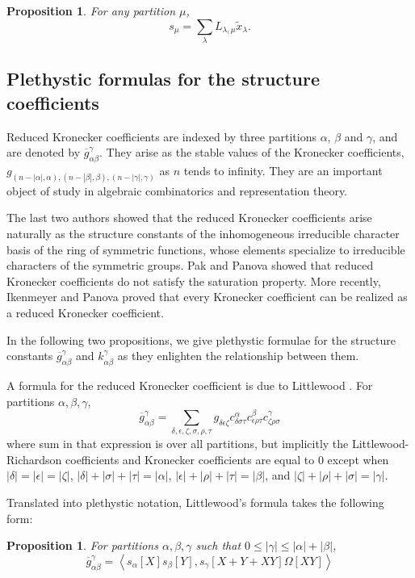 \documentclass{amsart}
\newtheorem{prop}[lemma]{Proposition}
\theoremstyle{definition}
\newcommand{\xt}{\tilde x}
\begin{document}
\begin{prop}
	For any partition $\mu$,
	\[s_\mu=\sum_\lambda L_{\lambda,\mu}\xt_\lambda.\]
\end{prop}


\subsection{Plethystic formulas for the structure coefficients} 
Reduced Kronecker coefficients are indexed by three partitions $\alpha$, $\beta$ and $\gamma$,
and are denoted by $\overline{g}_{\alpha\beta}^\gamma$. They arise as the stable values of
the Kronecker coefficients, $g_{(n-|\alpha|,\alpha), (n-|\beta|,\beta),(n-|\gamma|,\gamma)}$
as $n$ tends to infinity. They are an important object of study in algebraic combinatorics
and representation theory.

The last two authors \cite{OZ_character} showed that the reduced Kronecker coefficients
arise naturally as the structure constants of the inhomogeneous irreducible character
basis of the ring of symmetric functions, whose elements specialize to irreducible
characters of the symmetric groups. Pak and Panova \cite{PP2020} showed that reduced
Kronecker coefficients do not satisfy the saturation property. More recently,
Ikenmeyer and Panova \cite{IP2024} proved that every Kronecker coefficient can be
realized as a reduced Kronecker coefficient.

In the following two propositions, we give plethystic formulae for the
structure constants $\overline{g}_{\alpha\beta}^\gamma$ and $k_{\alpha\beta}^\gamma$ as they enlighten the relationship between them.



A formula for the reduced Kronecker coefficient is due to Littlewood
\cite[Theorem IX]{Littlewood}.  For partitions $\alpha, \beta, \gamma$,
\[
\overline{g}_{\alpha\beta}^\gamma = \sum_{\delta,\epsilon,\zeta, \sigma, \rho, \tau}
g_{\delta\epsilon\zeta} c^\alpha_{\delta\sigma\tau} c^\beta_{\epsilon\rho\tau} c^\gamma_{\zeta\rho\sigma}
\]
where sum in that expression is over all partitions, but implicitly
the Littlewood-Richardson coefficients
and Kronecker coefficients are equal to $0$ except when
$|\delta|=|\epsilon|=|\zeta|$, $|\delta|+|\sigma|+|\tau| = |\alpha|$,
$|\epsilon|+|\rho|+|\tau|=|\beta|$, and $|\zeta|+|\rho|+|\sigma|=|\gamma|$.

Translated into plethystic notation, Littlewood's formula takes the following form:

\begin{prop}
\label{prop:pleth_irred_structure}
For partitions $\alpha, \beta, \gamma$ such that $0 \leq |\gamma| \leqslant |\alpha|+|\beta|$,
\[
\overline{g}_{\alpha\beta}^\gamma = \left< s_\alpha[X] s_\beta[Y], s_\gamma[X+Y+XY] \Omega[XY] \right>
\]
\end{prop}
\end{document}
